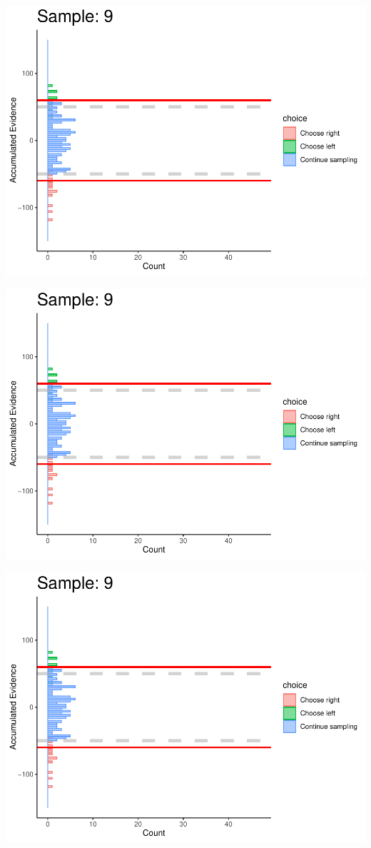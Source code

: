\documentclass[
]{book}
\begin{document}
\begin{center}\includegraphics[width=0.8\linewidth]{LateNightBayes_files/figure-latex/fixed_dcb-82} \end{center}

\begin{center}\includegraphics[width=0.8\linewidth]{LateNightBayes_files/figure-latex/fixed_dcb-83} \end{center}

\begin{center}\includegraphics[width=0.8\linewidth]{LateNightBayes_files/figure-latex/fixed_dcb-84} \end{center}
\end{document}
